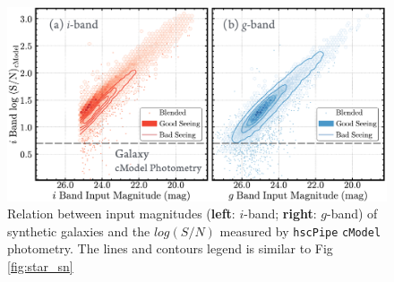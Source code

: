 \documentclass[useamsfonts]{pasj01}
\def\hscpipe{\texttt{hscPipe}}
\def\cmodel{\texttt{cModel}}
\begin{document}

\begin{figure}
    \begin{center}
        \includegraphics[width=\textwidth]{fig/synpipe_galaxy_sn}
    \end{center}
    \caption{
        Relation between input magnitudes (\textbf{left}: $i$-band; \textbf{right}:
        $g$-band) of synthetic galaxies and the $log(S/N)$ measured by \hscpipe{}
        \cmodel{} photometry.
        The lines and contours legend is similar to Fig \ref{fig:star_sn}
        }
    \label{fig:cmodel_sn}
\end{figure}
\end{document}
